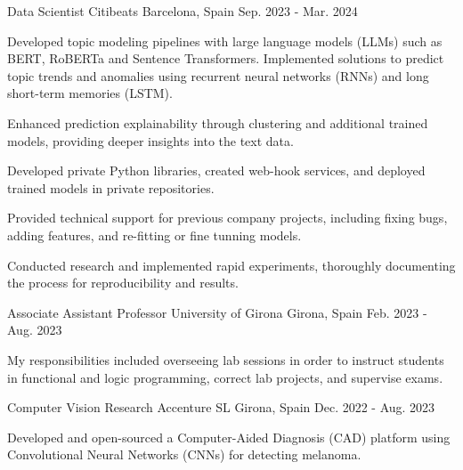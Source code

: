 

\begin{cventries}


  \cventry
  {Data Scientist} %
  {Citibeats} %
  {Barcelona, Spain} %
  {Sep. 2023 - Mar. 2024} %
  {
  \begin{cvitems}
\item{Developed topic modeling pipelines with large language models (LLMs) such as BERT, RoBERTa and Sentence Transformers.
      Implemented solutions to predict topic trends and anomalies using
    recurrent neural networks (RNNs) and long short-term memories (LSTM).}
\item{Enhanced prediction explainability through clustering and additional trained models, providing deeper insights into the text data.}
\item {Developed private Python libraries, created web-hook services, and deployed trained models in private repositories.}
\item {Provided technical support for previous company projects, including fixing bugs, adding features, and re-fitting or fine tunning models.}
\item {Conducted research and implemented rapid experiments, thoroughly documenting the process for reproducibility and results.}
  \end{cvitems}
}


  \cventry
  {Associate Assistant Professor} %
  {University of Girona} %
  {Girona, Spain} %
  {Feb. 2023 - Aug. 2023} %
  {
    \begin{cvitems} %
    \item {My responsibilities included overseeing lab
      sessions in order to instruct students in functional and logic programming,
    correct lab projects, and supervise exams.}
    \end{cvitems}
    }


    \cventry
    {Computer Vision Research} %
    {Accenture SL} %
    {Girona, Spain} %
    {Dec. 2022 - Aug. 2023} %
    {
    \begin{cvitems}
  \item {Developed and open-sourced a Computer-Aided Diagnosis (CAD) platform using Convolutional Neural Networks (CNNs) for detecting melanoma.}
    \end{cvitems}
    }


\end{cventries}
